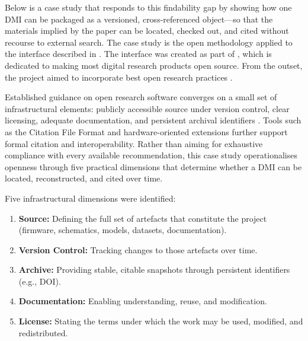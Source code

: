 
Below is a case study that responds to this findability gap by showing how one DMI can be packaged as a versioned, cross-referenced object---so that the materials implied by the paper can be located, checked out, and cited without recourse to external search. The case study is the open methodology applied to the interface described in . The interface was created as part of , which is dedicated to making most digital research products open source. From the outset, the project aimed to incorporate best open research practices \cite{chen_open_2019}.

Established guidance on open research software converges on a small set of infrastructural elements: publicly accessible source under version control, clear licensing, adequate documentation, and persistent archival identifiers \cite{ssi_checklist_2018, smith_software_2016}. Tools such as the Citation File Format \cite{druskat_citation_2021} and hardware-oriented extensions \cite{fiordelmondo_towards_2025} further support formal citation and interoperability. Rather than aiming for exhaustive compliance with every available recommendation, this case study operationalises openness through five practical dimensions that determine whether a DMI can be located, reconstructed, and cited over time.

Five infrastructural dimensions were identified:

\begin{enumerate}
    \item \textbf{Source:} Defining the full set of artefacts that constitute the project (firmware, schematics, models, datasets, documentation).
    \item \textbf{Version Control:} Tracking changes to those artefacts over time.
    \item \textbf{Archive:} Providing stable, citable snapshots through persistent identifiers (e.g., DOI).
    \item \textbf{Documentation:} Enabling understanding, reuse, and modification.
    \item \textbf{License:} Stating the terms under which the work may be used, modified, and redistributed.
\end{enumerate}

